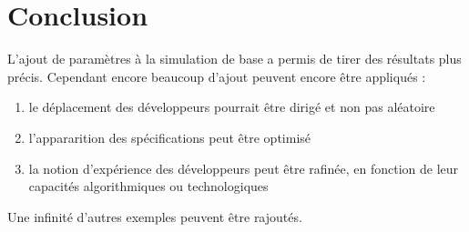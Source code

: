\documentclass{article}
\begin{document}
\section{Conclusion}
L'ajout de paramètres à la simulation de base a permis de tirer des
résultats plus précis. Cependant encore beaucoup d'ajout peuvent
encore être appliqués :
\begin{enumerate}
\item{le déplacement des développeurs pourrait être dirigé et non pas aléatoire}
\item{l'appararition des spécifications peut être optimisé}
\item{la notion d'expérience des développeurs peut être rafinée, en
    fonction de leur capacités algorithmiques ou technologiques}
\end{enumerate}
Une infinité d'autres exemples peuvent être rajoutés.
\end{document}
